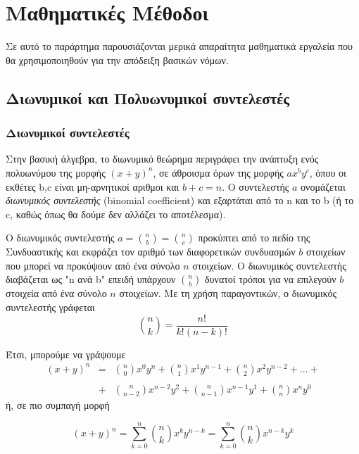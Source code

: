 \chapter{Μαθηματικές Μέθοδοι}
\label{apx:math_tools}

Σε αυτό το παράρτημα παρουσιάζονται μερικά απαραίτητα μαθηματικά εργαλεία που θα χρησιμοποιηθούν για την απόδειξη βασικών νόμων.

\section{Διωνυμικοί και Πολυωνυμικοί συντελεστές}

\subsection{Διωνυμικοί συντελεστές}
Στην βασική άλγεβρα, το διωνυμικό θεώρημα περιγράφει την ανάπτυξη ενός πολυωνύμου της μορφής $(x+y)^n$, σε άθροισμα όρων της μορφής $a x^b y^c$, όπου οι εκθέτες b,c είναι μη-αρνητικοί αριθμοι και $b+c=n$. Ο συντελεστής $a$ ονομάζεται \textit{διωνυμικός συντελεστής} (binomial coefficient) και εξαρτάται από το n και το b (ή το c, καθώς όπως θα δούμε δεν αλλάζει το αποτέλεσμα).

Ο διωνυμικός συντελεστής $a = {n \choose b} = \binom{n}{c}$ προκύπτει από το πεδίο της Συνδυαστικής και εκφράζει τον αριθμό των διαφορετικών συνδυασμών $b$ στοιχείων που μπορεί να προκύψουν από ένα σύνολο $n$ στοιχείων. Ο διωνυμικός συντελεστής διαβάζεται ως "n ανά b" επειδή υπάρχουν ${n \choose b}$ δυνατοί τρόποι για να επιλεγούν $b$ στοιχεία από ένα σύνολο $n$ στοιχείων. Με τη χρήση παραγοντικών, ο διωνυμικός συντελεστής γράφεται 
\begin{equation}
    \label{eq:apx:binomial_coefficient_factorial}
    {n \choose k} = \frac{n!}{k! (n-k)!}
\end{equation}

Έτσι, μπορούμε να γράψουμε
\begin{eqnarray*}
    (x+y)^n &=& {n \choose 0}x^0 y^n + {n\choose 1} x^1 y^{n-1} + {n \choose 2} x^2 y^{n-2} + \dots + \\\\
    &+& {n \choose n-2}x^{n-2} y^2 + {n \choose n-1} x^{n-1} y^1 + {n \choose n} x^n y^0
\end{eqnarray*}
ή, σε πιο συμπαγή μορφή

\begin{equation}
    \label{eq:apx:general_form}
    (x+y)^n = \sum_{k=0}^{n} {n \choose k} x^k y^{n-k} = \sum_{k=0}^{n} {n \choose k} x^{n-k} y^k
\end{equation}

